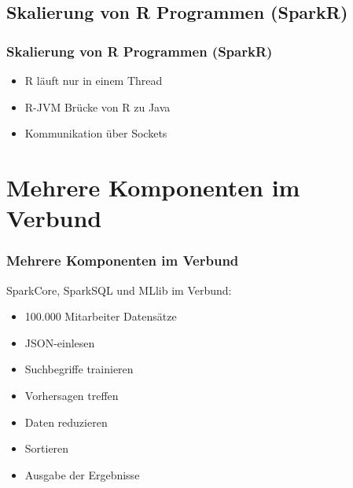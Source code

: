 \documentclass[hyperref={pdfpagelabels=false}]{beamer}
\begin{document}
\subsection{Skalierung von R Programmen (SparkR)}
\begin{frame} 
\frametitle{Skalierung von R Programmen (SparkR)}

\begin{itemize}
	\item R läuft nur in einem Thread
	\item R-JVM Brücke von R zu Java
	\item Kommunikation über Sockets 
\end{itemize}
\begin{figure}[h]
  \centering
\end{figure}

\end{frame}



\section{Mehrere Komponenten im Verbund}
\begin{frame} 
\frametitle{Mehrere Komponenten im Verbund}

SparkCore, SparkSQL und MLlib im Verbund: 
\begin{itemize}	
	\item 100.000 Mitarbeiter Datensätze
	\item JSON-einlesen	
	\item Suchbegriffe trainieren
	\item Vorhersagen treffen
	\item Daten reduzieren	
	\item Sortieren
	\item Ausgabe der Ergebnisse	
\end{itemize}

\end{frame}
\end{document}
